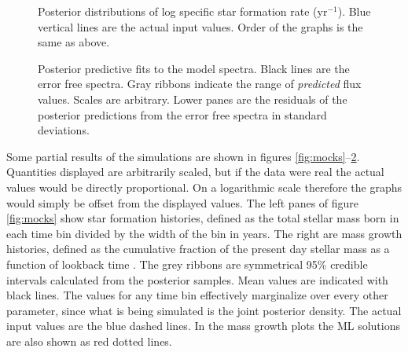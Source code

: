 \documentclass[modern]{aastex62}
\begin{document}
\begin{figure}[ht]
\centering
{}
\caption{Posterior distributions of log specific star formation rate (yr$^{-1}$). Blue vertical lines are the actual input values. Order of the graphs is the same as above.}
\label{fig:ssfr_mocks}
\end{figure}

\begin{figure}[ht]
\centering
{}
\caption{Posterior predictive fits to the model spectra. Black lines are the error free spectra. Gray ribbons indicate the range of \emph{predicted} flux values. Scales are arbitrary. Lower panes are the residuals of the posterior predictions from the error free spectra in standard deviations.}
\label{fig:specfits_mocks}
\end{figure}

Some partial results of the simulations are shown in figures \ref{fig:mocks}--\ref{fig:specfits_mocks}. Quantities displayed are arbitrarily scaled, but if the data were real the actual values would be directly proportional. On a logarithmic scale therefore the graphs would simply be offset from the displayed values. The left panes of figure \ref{fig:mocks} show star formation histories, defined as the total stellar mass born in each time bin divided by the width of the bin in years. The right are mass growth histories, defined as the cumulative fraction of the present day stellar mass as a function of lookback time \citep{2012ApJ...745..149L, 2015MNRAS.448.3484M, 2016MNRAS.463.2799I}. The grey ribbons are symmetrical 95\% credible intervals calculated from the posterior samples. Mean values are indicated with black lines. The values for any time bin effectively marginalize over every other parameter, since what is being simulated is the joint posterior density. The actual input values are the blue dashed lines. In the mass growth plots the ML solutions are also shown as red dotted lines.
\end{document}
